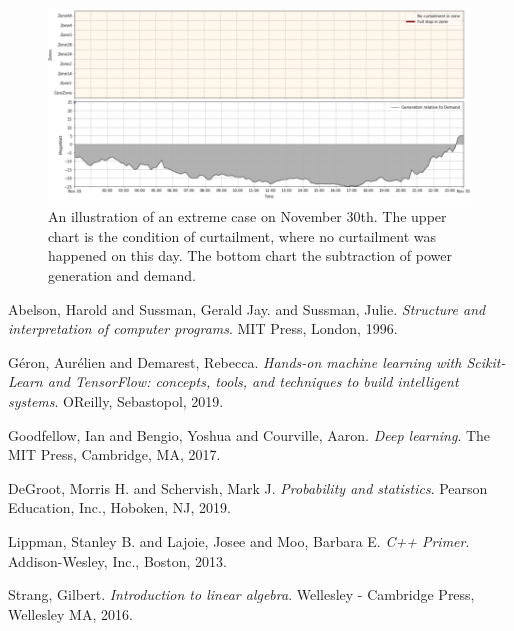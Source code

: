 \documentclass[12pt,a4paper]{report}
\begin{document}
    \begin{figure}[ht]
        \centerline{\includegraphics[scale=1.95]{extreme_case}}
        \caption{An illustration of an extreme case on November 30th. The upper chart is the condition of curtailment, where no curtailment was happened on this day. The bottom chart the subtraction of power generation and demand.}
        \label{fig_extreme_case}
    \end{figure}


    \cleardoublepage  
    \begin{thebibliography}{99}
        

        Abelson, Harold and Sussman, Gerald Jay. and Sussman, Julie. 
        \textit{Structure and interpretation of computer programs}. 
        MIT Press, London, 1996.

        Géron, Aurélien and Demarest, Rebecca. 
        \textit{Hands-on machine learning with Scikit-Learn and TensorFlow: concepts, tools, and techniques to build intelligent systems}. 
        OReilly, Sebastopol, 2019.

        Goodfellow, Ian and Bengio, Yoshua and Courville, Aaron. 
        \textit{Deep learning}. 
        The MIT Press, Cambridge, MA, 2017.

        DeGroot, Morris H. and Schervish, Mark J. 
        \textit{Probability and statistics}. 
        Pearson Education, Inc., Hoboken, NJ, 2019.

        Lippman, Stanley B. and Lajoie, Josee and Moo, Barbara E. 
        \textit{C++ Primer}. 
        Addison-Wesley, Inc., Boston, 2013.

        Strang, Gilbert. 
        \textit{Introduction to linear algebra}. 
        Wellesley - Cambridge Press, Wellesley MA, 2016.



    \end{thebibliography}
    \renewcommand{\bibname}{References}

    \cleardoublepage  
    
    
\end{document}
